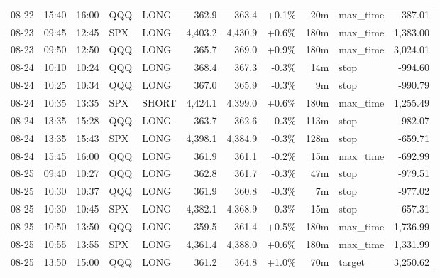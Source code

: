 \documentclass[11pt,a4paper,twoside]{article}
\begin{document}
\begin{center}
\begin{longtable}{>{\color{txtmain}}l l l l l r r r r >{\color{txtmain}}l r}
08-22 & 15:40 & 16:00 & QQQ & LONG & 362.9 & 363.4 & \textcolor{wingreen}{+0.1\%} & 20m & max\_time & \textcolor{wingreen}{387.01} \\
08-23 & 09:45 & 12:45 & SPX & LONG & 4,403.2 & 4,430.9 & \textcolor{wingreen}{+0.6\%} & 180m & max\_time & \textcolor{wingreen}{1,383.00} \\
08-23 & 09:50 & 12:50 & QQQ & LONG & 365.7 & 369.0 & \textcolor{wingreen}{+0.9\%} & 180m & max\_time & \textcolor{wingreen}{3,024.01} \\
08-24 & 10:10 & 10:24 & QQQ & LONG & 368.4 & 367.3 & \textcolor{lossred}{-0.3\%} & 14m & stop & \textcolor{lossred}{-994.60} \\
08-24 & 10:25 & 10:34 & QQQ & LONG & 367.0 & 365.9 & \textcolor{lossred}{-0.3\%} & 9m & stop & \textcolor{lossred}{-990.79} \\
08-24 & 10:35 & 13:35 & SPX & SHORT & 4,424.1 & 4,399.0 & \textcolor{wingreen}{+0.6\%} & 180m & max\_time & \textcolor{wingreen}{1,255.49} \\
08-24 & 13:35 & 15:28 & QQQ & LONG & 363.7 & 362.6 & \textcolor{lossred}{-0.3\%} & 113m & stop & \textcolor{lossred}{-982.07} \\
08-24 & 13:35 & 15:43 & SPX & LONG & 4,398.1 & 4,384.9 & \textcolor{lossred}{-0.3\%} & 128m & stop & \textcolor{lossred}{-659.71} \\
08-24 & 15:45 & 16:00 & QQQ & LONG & 361.9 & 361.1 & \textcolor{lossred}{-0.2\%} & 15m & max\_time & \textcolor{lossred}{-692.99} \\
08-25 & 09:40 & 10:27 & QQQ & LONG & 362.8 & 361.7 & \textcolor{lossred}{-0.3\%} & 47m & stop & \textcolor{lossred}{-979.51} \\
08-25 & 10:30 & 10:37 & QQQ & LONG & 361.9 & 360.8 & \textcolor{lossred}{-0.3\%} & 7m & stop & \textcolor{lossred}{-977.02} \\
08-25 & 10:30 & 10:45 & SPX & LONG & 4,382.1 & 4,368.9 & \textcolor{lossred}{-0.3\%} & 15m & stop & \textcolor{lossred}{-657.31} \\
08-25 & 10:50 & 13:50 & QQQ & LONG & 359.5 & 361.4 & \textcolor{wingreen}{+0.5\%} & 180m & max\_time & \textcolor{wingreen}{1,736.99} \\
08-25 & 10:55 & 13:55 & SPX & LONG & 4,361.4 & 4,388.0 & \textcolor{wingreen}{+0.6\%} & 180m & max\_time & \textcolor{wingreen}{1,331.99} \\
08-25 & 13:50 & 15:00 & QQQ & LONG & 361.2 & 364.8 & \textcolor{wingreen}{+1.0\%} & 70m & target & \textcolor{wingreen}{3,250.62} \\

\end{longtable}
\end{center}
\end{document}
